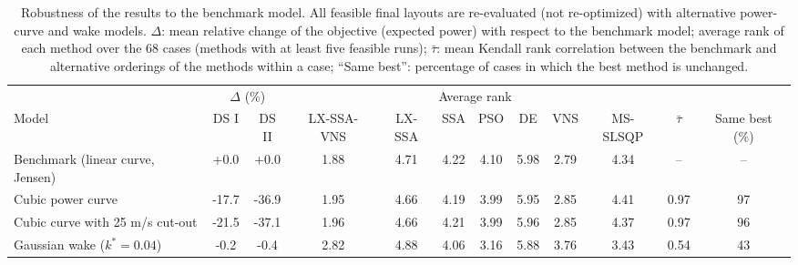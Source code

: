 \begin{table}[!t]
\centering
\caption{Robustness of the results to the benchmark model. All feasible final layouts are re-evaluated (not re-optimized) with alternative power-curve and wake models. $\Delta$: mean relative change of the objective (expected power) with respect to the benchmark model; average rank of each method over the 68 cases (methods with at least five feasible runs); $\bar\tau$: mean Kendall rank correlation between the benchmark and alternative orderings of the methods within a case; ``Same best'': percentage of cases in which the best method is unchanged.}
\label{tab:robust-final}
\scriptsize\setlength{\tabcolsep}{3pt}
\begin{tabular}{lccccccccccc}
\toprule
& \multicolumn{2}{c}{$\Delta$ (\%)} & \multicolumn{7}{c}{Average rank} & & \\
\cmidrule(lr){2-3}\cmidrule(lr){4-10}
Model & DS I & DS II & LX-SSA-VNS & LX-SSA & SSA & PSO & DE & VNS & MS-SLSQP & $\bar\tau$ & Same best (\%) \\
\midrule
Benchmark (linear curve, Jensen) & +0.0 & +0.0 & 1.88 & 4.71 & 4.22 & 4.10 & 5.98 & 2.79 & 4.34 & -- & -- \\
Cubic power curve & -17.7 & -36.9 & 1.95 & 4.66 & 4.19 & 3.99 & 5.95 & 2.85 & 4.41 & 0.97 & 97 \\
Cubic curve with 25 m/s cut-out & -21.5 & -37.1 & 1.96 & 4.66 & 4.21 & 3.99 & 5.96 & 2.85 & 4.37 & 0.97 & 96 \\
Gaussian wake ($k^*=0.04$) & -0.2 & -0.4 & 2.82 & 4.88 & 4.06 & 3.16 & 5.88 & 3.76 & 3.43 & 0.54 & 43 \\
\bottomrule
\end{tabular}
\end{table}
